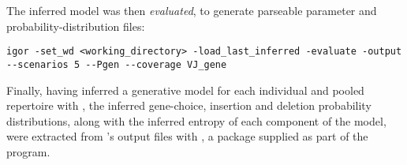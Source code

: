\noindent The inferred model was then \textit{evaluated}, to generate parseable parameter and probability-distribution files:

\begin{lstlisting}
igor -set_wd <working_directory> -load_last_inferred -evaluate -output --scenarios 5 --Pgen --coverage VJ_gene
\end{lstlisting}

\noindent Finally, having inferred a generative model for each individual and pooled repertoire with , the inferred gene-choice, insertion and deletion probability distributions, along with the inferred entropy of each component of the model, were extracted from 's output files with , a  package supplied as part of the  program.